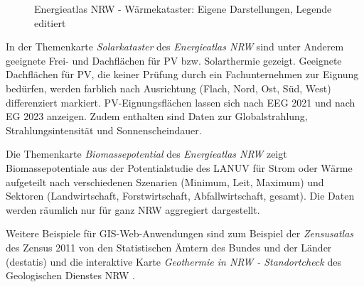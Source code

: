\begin{figure}[h]
{						\label{fig:subfig6}}
					\qquad
					\caption{Energieatlas NRW - Wärmekataster: Eigene Darstellungen, Legende editiert \cite{web_energieatlas}}
					\label{fig:energieatlas_waermekataster}
				\end{figure}
				
				In der Themenkarte \textit{Solarkataster} des \textit{Energieatlas NRW} sind unter Anderem geeignete Frei- und Dachflächen für PV bzw. Solarthermie gezeigt. Geeignete Dachflächen für PV, die keiner Prüfung durch ein Fachunternehmen zur Eignung bedürfen, werden farblich nach Ausrichtung (Flach, Nord, Ost, Süd, West) differenziert markiert. PV-Eignungsflächen lassen sich nach EEG 2021 und nach EG 2023 anzeigen. Zudem enthalten sind Daten zur Globalstrahlung, Strahlungsintensität und Sonnenscheindauer. \cite{web_energieatlas}
				
				Die Themenkarte \textit{Biomassepotential} des \textit{Energieatlas NRW} zeigt Biomassepotentiale aus der Potentialstudie des LANUV für Strom oder Wärme aufgeteilt nach verschiedenen Szenarien (Minimum, Leit, Maximum) und Sektoren (Landwirtschaft, Forstwirtschaft, Abfallwirtschaft, gesamt). Die Daten werden räumlich nur für ganz NRW aggregiert dargestellt. \cite{web_energieatlas}
				
				Weitere Beispiele für GIS-Web-Anwendungen sind zum Beispiel der \textit{Zensusatlas} des Zensus 2011 von den Statistischen Ämtern des Bundes und der Länder (destatis) \cite{web_zensusatlas} und die interaktive Karte \textit{Geothermie in NRW - Standortcheck} des Geologischen Dienstes NRW \cite{web_geothermie_standortcheck_nrw}. 
	